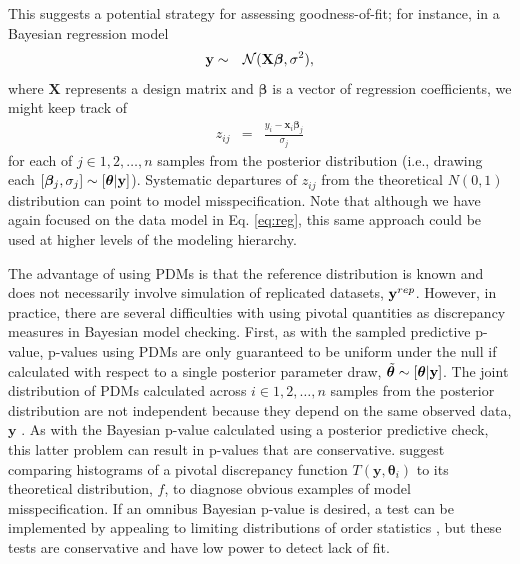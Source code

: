\documentclass[12pt,english]{article}
\begin{document}
\begin{spacing}{1.9}
This suggests a potential strategy for assessing goodness-of-fit; for instance, in a Bayesian regression model
\begin{eqnarray}
  \label{eq:reg}
  {\bf y} & \sim & \mathcal{N}(\textbf{X} \boldsymbol{\beta},\sigma^2),
\end{eqnarray}
where $\textbf{X}$ represents a design matrix and $\boldsymbol{\beta}$ is a vector of regression coefficients, we might keep track of
\begin{eqnarray}
  \label{eq:resid}
  z_{ij} & = & \frac{y_i - \textbf{x}_i \boldsymbol{\beta}_j}{\sigma_j}
\end{eqnarray}
for each of $j \in {1, 2, \hdots, n}$ samples from the posterior distribution (i.e., drawing each $[\boldsymbol{\beta}_j,\sigma_j] \sim [\boldsymbol{\theta}|{\bf y}]$).  Systematic departures of $z_{ij}$ from the theoretical $N(0,1)$ distribution can point to model misspecification.  Note that although we have again focused on the data model in Eq. \ref{eq:reg}, this same approach could be used at higher levels of the modeling hierarchy.

The advantage of using PDMs is that the reference distribution is known and does not necessarily involve simulation of replicated datasets, ${\bf y}^{rep}$.  However, in practice, there are several difficulties with using pivotal quantities as discrepancy measures in Bayesian model checking.  First, as with the sampled predictive p-value, p-values using PDMs are only guaranteed to be uniform under the null if calculated with respect to a single posterior parameter draw, $\tilde{\boldsymbol{\theta}} \sim [\boldsymbol{\theta} | {\bf y}]$.  The joint distribution of PDMs calculated across $i \in 1,2,\hdots,n$ samples from the posterior distribution are not independent because they depend on the same observed data, $\textbf{y}$ \citep{Johnson2004}.  As with the Bayesian p-value calculated using a posterior predictive check, this latter problem can result in p-values that are conservative.  \citet{YuanJohnson2012} suggest comparing histograms of a pivotal discrepancy function $T(\textbf{y},\boldsymbol{\theta}_i)$ to its theoretical distribution, $f$, to diagnose obvious examples of model misspecification.  If an omnibus Bayesian p-value is desired, a test can be implemented by appealing to limiting distributions of order statistics \citep{Johnson2004}, but these tests are conservative and have low power to detect lack of fit.


\end{spacing}
\end{document}
